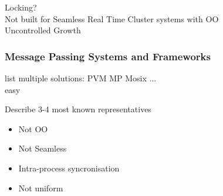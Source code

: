 Locking?\\
Not built for Seamless Real Time Cluster systems with OO\\
Uncontrolled Growth

\subsubsection{Message Passing Systems and Frameworks}

list multiple solutions: PVM MP Mosix ...\\
easy

Describe 3-4 most known representatives
\begin{itemize}
	\item Not OO
	\item Not Seamless
	\item Intra-process syncronisation
	\item Not uniform
\end{itemize}

